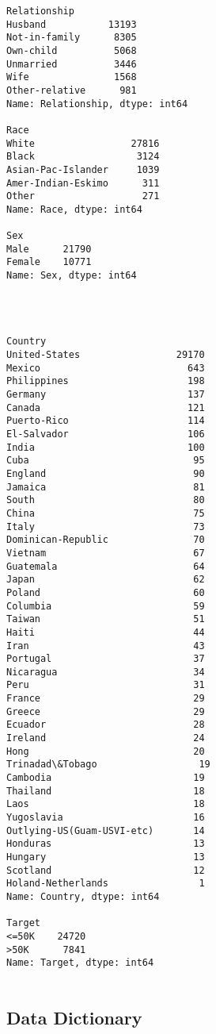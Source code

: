 \documentclass{report}
\begin{document}
\begin{Verbatim}[commandchars=\\\{\}]
Relationship
Husband           13193
Not-in-family      8305
Own-child          5068
Unmarried          3446
Wife               1568
Other-relative      981
Name: Relationship, dtype: int64

Race
White                 27816
Black                  3124
Asian-Pac-Islander     1039
Amer-Indian-Eskimo      311
Other                   271
Name: Race, dtype: int64

Sex
Male      21790
Female    10771
Name: Sex, dtype: int64




Country
United-States                 29170
Mexico                          643
Philippines                     198
Germany                         137
Canada                          121
Puerto-Rico                     114
El-Salvador                     106
India                           100
Cuba                             95
England                          90
Jamaica                          81
South                            80
China                            75
Italy                            73
Dominican-Republic               70
Vietnam                          67
Guatemala                        64
Japan                            62
Poland                           60
Columbia                         59
Taiwan                           51
Haiti                            44
Iran                             43
Portugal                         37
Nicaragua                        34
Peru                             31
France                           29
Greece                           29
Ecuador                          28
Ireland                          24
Hong                             20
Trinadad\&Tobago                  19
Cambodia                         19
Thailand                         18
Laos                             18
Yugoslavia                       16
Outlying-US(Guam-USVI-etc)       14
Honduras                         13
Hungary                          13
Scotland                         12
Holand-Netherlands                1
Name: Country, dtype: int64

Target
<=50K    24720
>50K      7841
Name: Target, dtype: int64


    \end{Verbatim}

\subsection{Data Dictionary}\label{data-dictionary}
\end{document}
